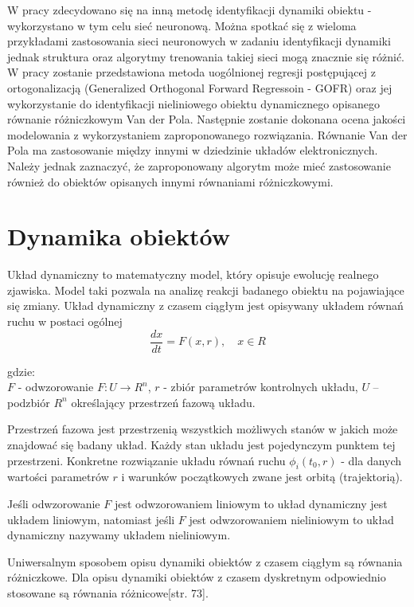 	W pracy zdecydowano się na inną metodę identyfikacji dynamiki obiektu - wykorzystano w tym celu sieć neuronową. Można spotkać się z wieloma przykładami zastosowania sieci neuronowych w zadaniu identyfikacji dynamiki jednak struktura oraz algorytmy trenowania takiej sieci  mogą znacznie się różnić. W pracy zostanie przedstawiona metoda uogólnionej regresji postępującej z ortogonalizacją (Generalized Orthogonal Forward Regressoin - GOFR) oraz jej wykorzystanie do identyfikacji nieliniowego obiektu dynamicznego opisanego równanie różniczkowym Van der Pola. Następnie zostanie dokonana ocena jakości modelowania z wykorzystaniem zaproponowanego rozwiązania. Równanie Van der Pola ma zastosowanie między innymi w dziedzinie układów elektronicznych\cite{Palczewski}. Należy jednak zaznaczyć, że zaproponowany algorytm może mieć zastosowanie również do obiektów opisanych innymi równaniami różniczkowymi.  

\newpage
\section{Dynamika obiektów}
Układ dynamiczny to matematyczny model, który opisuje ewolucję realnego zjawiska. Model taki pozwala na analizę reakcji badanego obiektu na pojawiające się zmiany.
Układ dynamiczny z czasem ciągłym jest opisywany układem równań ruchu w postaci ogólnej\cite{Kosinski}
\begin{equation}
	\frac{dx}{dt} = F(x,r), \quad x \in R
\end{equation}

gdzie: \\
$F$ - odwzorowanie $F:U \rightarrow R^n$,
$r$ - zbiór parametrów kontrolnych układu,
$U$ – podzbiór $R^n$ określający przestrzeń fazową układu.

Przestrzeń fazowa jest przestrzenią wszystkich możliwych stanów w jakich może znajdować się badany układ. Każdy stan układu jest pojedynczym punktem tej przestrzeni. Konkretne rozwiązanie układu równań ruchu $\phi_i(t_0,r)$ - dla danych wartości parametrów $r$ i warunków początkowych zwane jest orbitą (trajektorią).

Jeśli odwzorowanie $F$ jest odwzorowaniem liniowym to układ dynamiczny jest układem liniowym, natomiast jeśli $F$ jest odwzorowaniem nieliniowym to układ dynamiczny nazywamy układem nieliniowym.

Uniwersalnym sposobem opisu dynamiki obiektów z czasem ciągłym są równania różniczkowe. Dla opisu dynamiki obiektów z czasem dyskretnym odpowiednio stosowane są równania różnicowe\cite{Gutenbaum}[str. 73].
